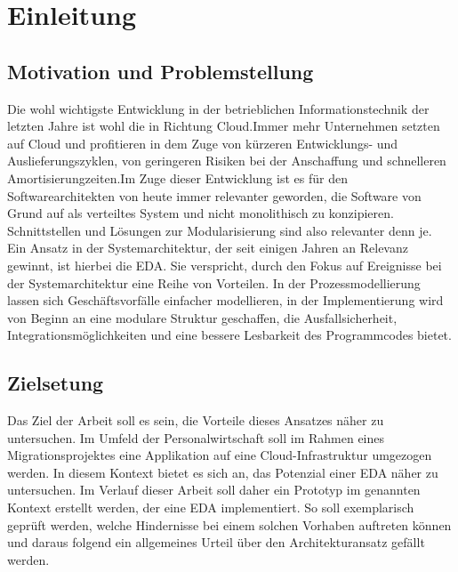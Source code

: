 \section{Einleitung}


\subsection{Motivation und Problemstellung}
Die wohl wichtigste Entwicklung in der betrieblichen Informationstechnik der letzten Jahre ist wohl die in Richtung Cloud.\citepls Immer mehr Unternehmen setzten auf Cloud und profitieren in dem Zuge von kürzeren Entwicklungs- und Auslieferungszyklen, von geringeren Risiken bei der Anschaffung und schnelleren Amortisierungzeiten.\citepls Im Zuge dieser Entwicklung ist es für den Softwarearchitekten von heute immer relevanter geworden, die Software von Grund auf als verteiltes System und nicht monolithisch zu konzipieren. Schnittstellen und Lösungen zur Modularisierung sind also relevanter denn je. \\
Ein Ansatz in der Systemarchitektur, der seit einigen Jahren an Relevanz gewinnt, ist hierbei die \ac{EDA}. Sie verspricht, durch den Fokus auf Ereignisse bei der Systemarchitektur eine Reihe von Vorteilen. In der Prozessmodellierung lassen sich Geschäftsvorfälle einfacher modellieren, in der Implementierung wird von Beginn an eine modulare Struktur geschaffen, die Ausfallsicherheit, Integrationsmöglichkeiten und eine bessere Lesbarkeit des Programmcodes bietet.\citepls

\subsection{Zielsetung}
Das Ziel der Arbeit soll es sein, die Vorteile dieses Ansatzes näher zu untersuchen. Im Umfeld der Personalwirtschaft soll im Rahmen eines Migrationsprojektes eine Applikation auf eine Cloud-Infrastruktur umgezogen werden. In diesem Kontext bietet es sich an, das Potenzial einer \ac{EDA} näher zu untersuchen. Im Verlauf dieser Arbeit soll daher ein Prototyp im genannten Kontext erstellt werden, der eine \ac{EDA} implementiert. So soll exemplarisch geprüft werden, welche Hindernisse bei einem solchen Vorhaben auftreten können und daraus folgend ein allgemeines Urteil über den Architekturansatz gefällt werden.

